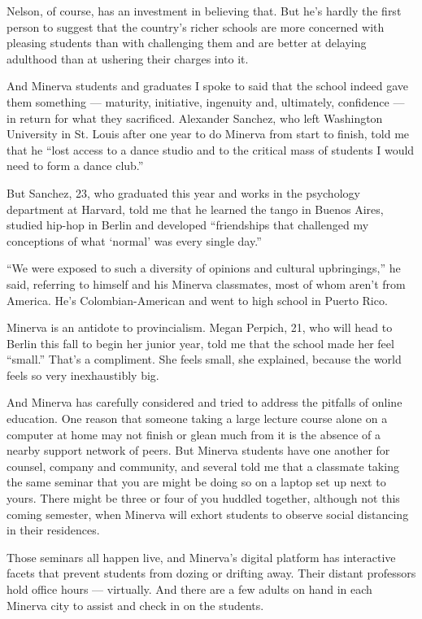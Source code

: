 Nelson, of course, has an investment in believing that. But he's hardly
the first person to suggest that the country's richer schools are more
concerned with pleasing students than with challenging them and are
better at delaying adulthood than at ushering their charges into it.

And Minerva students and graduates I spoke to said that the school
indeed gave them something --- maturity, initiative, ingenuity and,
ultimately, confidence --- in return for what they sacrificed. Alexander
Sanchez, who left Washington University in St. Louis after one year to
do Minerva from start to finish, told me that he ``lost access to a
dance studio and to the critical mass of students I would need to form a
dance club.''

But Sanchez, 23, who graduated this year and works in the psychology
department at Harvard, told me that he learned the tango in Buenos
Aires, studied hip-hop in Berlin and developed ``friendships that
challenged my conceptions of what `normal' was every single day.''

``We were exposed to such a diversity of opinions and cultural
upbringings,'' he said, referring to himself and his Minerva classmates,
most of whom aren't from America. He's Colombian-American and went to
high school in Puerto Rico.

Minerva is an antidote to provincialism. Megan Perpich, 21, who will
head to Berlin this fall to begin her junior year, told me that the
school made her feel ``small.'' That's a compliment. She feels small,
she explained, because the world feels so very inexhaustibly big.

And Minerva has carefully considered and tried to address the pitfalls
of online education. One reason that someone taking a large lecture
course alone on a computer at home may not finish or glean much from it
is the absence of a nearby support network of peers. But Minerva
students have one another for counsel, company and community, and
several told me that a classmate taking the same seminar that you are
might be doing so on a laptop set up next to yours. There might be three
or four of you huddled together, although not this coming semester, when
Minerva will exhort students to observe social distancing in their
residences.

Those seminars all happen live, and Minerva's digital platform has
interactive facets that prevent students from dozing or drifting away.
Their distant professors hold office hours --- virtually. And there are
a few adults on hand in each Minerva city to assist and check in on the
students.

